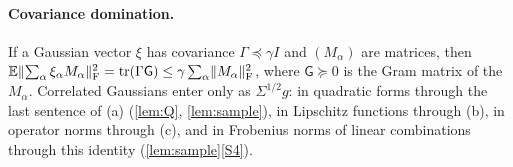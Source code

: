 \paragraph{Covariance domination.} If a Gaussian vector $\xi$ has covariance
$\Gamma\preceq\gamma I$ and $(M_\alpha)$ are matrices, then
$\mathbb E\lVert \sum_\alpha\xi_\alpha M_\alpha\rVert_{\mathrm F}^2=\operatorname{tr}(\Gamma\mathsf G)\le\gamma\sum_\alpha
\lVert M_\alpha\rVert_{\mathrm F}^2$, where $\mathsf G\succeq0$ is the Gram matrix of the $M_\alpha$.
Correlated Gaussians enter only as $\Sigma^{1/2}g$: in quadratic forms through the
last sentence of (a) (\cref{lem:Q}, \cref{lem:sample}), in Lipschitz functions
through (b), in operator norms through (c), and in Frobenius norms of linear
combinations through this identity (\cref{lem:sample}\ref{S4}).
